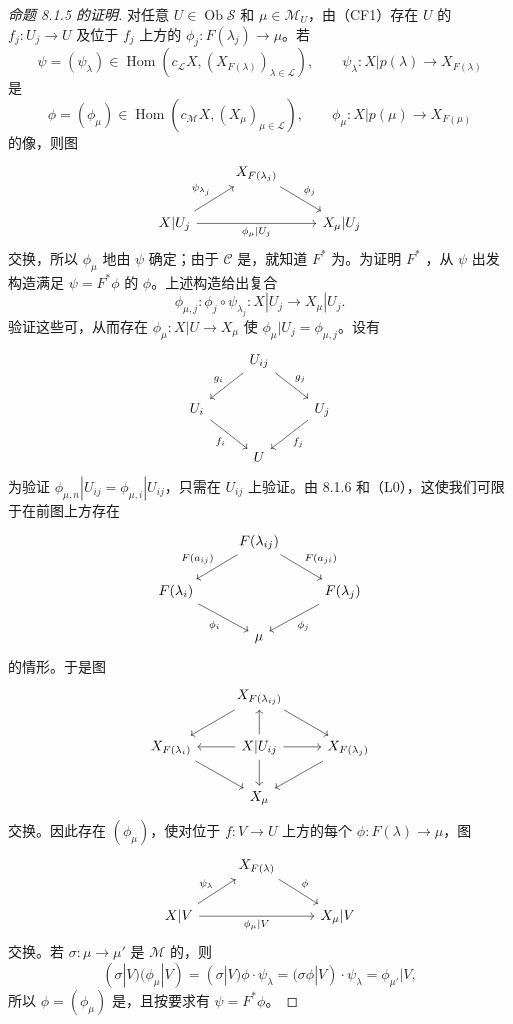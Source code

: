 \begin{proof}[命题 8.1.5 的证明]
对任意 $U\in\operatorname{Ob}\mathscr S$ 和 $\mu\in\mathscr M_U$，由（CF1）存在 $U$ 的 $f_j:U_j\to U$ 及位于 $f_j$ 上方的 $\phi_j:F(\lambda_j)\to\mu$。若
\[\psi=(\psi_\lambda)\in\operatorname{Hom}(c_{\mathscr L}X,(X_{F(\lambda)})_{\lambda\in\mathscr L}),\qquad\psi_\lambda:X|p(\lambda)\to X_{F(\lambda)}\]
是
\[\phi=(\phi_\mu)\in\operatorname{Hom}(c_{\mathscr M}X,(X_\mu)_{\mu\in\mathscr L}),\qquad\phi_\mu:X|p(\mu)\to X_{F(\mu)}\]
的像，则图
\[\begin{tikzcd}&X_{F(\lambda_j)}\arrow[dr,"\phi_j"]&\\
X|U_j\arrow[ur,"\psi_{\lambda_j}"]\arrow[rr,"\phi_\mu|U_j"']&&X_\mu|U_j
\end{tikzcd}\]
交换，所以 $\phi_\mu$ 地由 $\psi$ 确定；由于 $\mathscr C$ 是，就知道 $F^*$ 为。为证明 $F^*$ ，从 $\psi$ 出发构造满足 $\psi=F^*\phi$ 的 $\phi$。上述构造给出复合
\[\phi_{\mu,j}:\phi_j\circ\psi_{\lambda_j}:X|U_j\longrightarrow X_\mu|U_j.\]
验证这些可，从而存在 $\phi_\mu:X|U\to X_\mu$ 使 $\phi_\mu|U_j=\phi_{\mu,j}$。设有
\[\begin{tikzcd}&U_{ij}\arrow[dl,"g_i"']\arrow[dr,"g_j"]&\\
U_i\arrow[dr,"f_i"']&&U_j\arrow[dl,"f_j"]\\&U&
\end{tikzcd}\]
为验证 $\phi_{\mu,n}|U_{ij}=\phi_{\mu,i}|U_{ij}$，只需在 $U_{ij}$ 上验证。由 8.1.6 和（L0），这使我们可限于在前图上方存在
\[\begin{tikzcd}&F(\lambda_{ij})\arrow[dl,"F(a_{ij})"']\arrow[dr,"F(a_{ji})"]&\\
F(\lambda_i)\arrow[dr,"\phi_i"']&&F(\lambda_j)\arrow[dl,"\phi_j"]\\&\mu&
\end{tikzcd}\]
的情形。于是图
\[\begin{tikzcd}&X_{F(\lambda_{ij})}\arrow[dl]\arrow[dr]&\\
X_{F(\lambda_i)}\arrow[dr]&X|U_{ij}\arrow[u]\arrow[l]\arrow[r]\arrow[d]&X_{F(\lambda_j)}\arrow[dl]\\&X_\mu&
\end{tikzcd}\]
交换。因此存在 $(\phi_\mu)$，使对位于 $f:V\to U$ 上方的每个 $\phi:F(\lambda)\to\mu$，图
\[\begin{tikzcd}&X_{F(\lambda)}\arrow[dr,"\phi"]&\\
X|V\arrow[ur,"\psi_\lambda"]\arrow[rr,"\phi_\mu|V"']&&X_\mu|V
\end{tikzcd}\]
交换。若 $\sigma:\mu\to\mu'$ 是 $\mathscr M$ 的，则
\[(\sigma|V)(\phi_\mu|V)=(\sigma|V)\phi\cdot\psi_\lambda=(\sigma\phi|V)\cdot\psi_\lambda=\phi_{\mu'}|V,\]
所以 $\phi=(\phi_\mu)$ 是，且按要求有 $\psi=F^*\phi$。
\end{proof}
